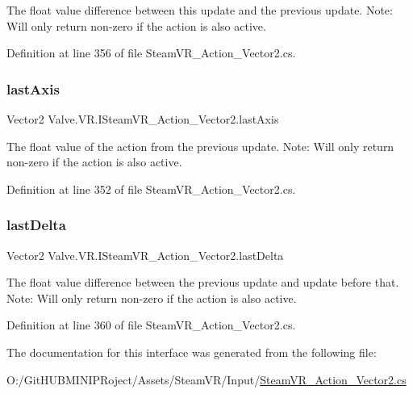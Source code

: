 The float value difference between this update and the previous update. Note\+: Will only return non-\/zero if the action is also active. 



Definition at line 356 of file Steam\+V\+R\+\_\+\+Action\+\_\+\+Vector2.\+cs.

\mbox{\label{interface_valve_1_1_v_r_1_1_i_steam_v_r___action___vector2_aac73e1bef5867421fcba37e80d6cb18b}} 
\subsubsection{\texorpdfstring{lastAxis}{lastAxis}}
{\footnotesize\ttfamily Vector2 Valve.\+V\+R.\+I\+Steam\+V\+R\+\_\+\+Action\+\_\+\+Vector2.\+last\+Axis\hspace{0.3cm}{\ttfamily [get]}}



The float value of the action from the previous update. Note\+: Will only return non-\/zero if the action is also active. 



Definition at line 352 of file Steam\+V\+R\+\_\+\+Action\+\_\+\+Vector2.\+cs.

\mbox{\label{interface_valve_1_1_v_r_1_1_i_steam_v_r___action___vector2_a702b333f19104d4390a85d3e2f114b3e}} 
\subsubsection{\texorpdfstring{lastDelta}{lastDelta}}
{\footnotesize\ttfamily Vector2 Valve.\+V\+R.\+I\+Steam\+V\+R\+\_\+\+Action\+\_\+\+Vector2.\+last\+Delta\hspace{0.3cm}{\ttfamily [get]}}



The float value difference between the previous update and update before that. Note\+: Will only return non-\/zero if the action is also active. 



Definition at line 360 of file Steam\+V\+R\+\_\+\+Action\+\_\+\+Vector2.\+cs.



The documentation for this interface was generated from the following file\+:\begin{DoxyCompactItemize}
\item 
O\+:/\+Git\+H\+U\+B\+M\+I\+N\+I\+P\+Roject/\+Assets/\+Steam\+V\+R/\+Input/\mbox{\hyperlink{_steam_v_r___action___vector2_8cs}{Steam\+V\+R\+\_\+\+Action\+\_\+\+Vector2.\+cs}}\end{DoxyCompactItemize}
